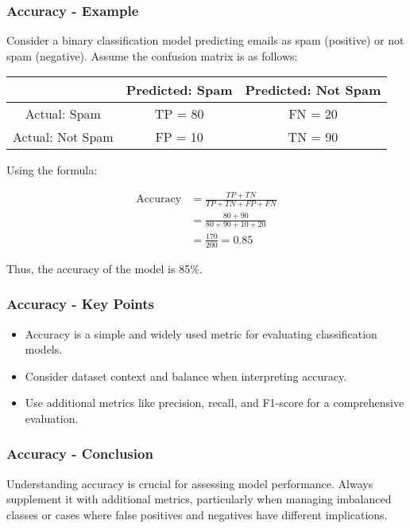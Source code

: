 \documentclass[aspectratio=169]{beamer}
\begin{document}
\begin{frame}[fragile]
    \frametitle{Accuracy - Example}
    Consider a binary classification model predicting emails as spam (positive) or not spam (negative). Assume the confusion matrix is as follows:

    \begin{center}
    \begin{tabular}{|c|c|c|}
        \hline
        & Predicted: Spam & Predicted: Not Spam \\
        \hline
        Actual: Spam & TP = 80 & FN = 20 \\
        \hline
        Actual: Not Spam & FP = 10 & TN = 90 \\
        \hline
    \end{tabular}
    \end{center}

    Using the formula:

    \[
    \begin{align*}
    \text{Accuracy} & = \frac{TP + TN}{TP + TN + FP + FN} \\
                    & = \frac{80 + 90}{80 + 90 + 10 + 20} \\
                    & = \frac{170}{200} = 0.85
    \end{align*}
    \]

    Thus, the accuracy of the model is 85\%.
\end{frame}

\begin{frame}[fragile]
    \frametitle{Accuracy - Key Points}
    \begin{itemize}
        \item Accuracy is a simple and widely used metric for evaluating classification models.
        \item Consider dataset context and balance when interpreting accuracy.
        \item Use additional metrics like precision, recall, and F1-score for a comprehensive evaluation.
    \end{itemize}
\end{frame}

\begin{frame}[fragile]
    \frametitle{Accuracy - Conclusion}
    Understanding accuracy is crucial for assessing model performance. Always supplement it with additional metrics, particularly when managing imbalanced classes or cases where false positives and negatives have different implications.
\end{frame}
\end{document}
